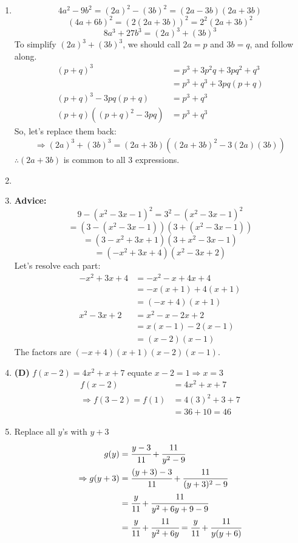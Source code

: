 \begin{multicols}{2}
\begin{enumerate}[label={\textbf{\arabic*.}}]
    \item 
    \[4a^2 - 9b^2 = (2a)^2 - (3b)^2 = (2a - 3b)(2a + 3b)\]
    \[(4a + 6b)^2 = \left(2(2a + 3b)\right)^2 = 2^2 (2a + 3b)^2\]
    \[ 8a^3 + 27b^3 = (2a)^3 + (3b)^3 \]
    To simplify \( (2a)^3 + (3b)^3 \), we should call \( 2a = p \) and \( 3b = q \), and follow along.
    \begin{align*}
        (p + q)^3 &= p^3 + 3p^2q + 3pq^2 + q^3 \\
        &= p^3 + q^3 + 3pq(p + q) \\
        (p + q)^3 - 3pq(p + q) &= p^3 + q^3 \\
        (p + q)((p + q)^2 - 3pq) &= p^3 + q^3
    \end{align*}
    So, let's replace them back:
    \[\Rightarrow (2a)^3 + (3b)^3 = (2a + 3b)\left((2a + 3b)^2 - 3(2a)(3b)\right)\]
    \(\therefore (2a + 3b)\) is common to all 3 expressions.

    \item
    \item \textbf{Advice:} 
    \[ 9 - (x^2 - 3x - 1)^2 = 3^2 - (x^2 - 3x - 1)^2\]  
    \[ = (3 - (x^2 - 3x - 1))(3 + (x^2 - 3x - 1))\]
    \[ = (3 - x^2 + 3x + 1)(3 + x^2 - 3x - 1) \]
    \[= (-x^2 + 3x + 4)(x^2 - 3x + 2)\]
    Let's resolve each part:
    \begin{align*}
    -x^2 + 3x + 4 &= -x^2 - x + 4x + 4 \\
    &= -x(x + 1) + 4(x + 1) \\
    &= (-x + 4)(x + 1)\\
    x^2 - 3x + 2 &= x^2 - x - 2x + 2 \\
    &= x(x - 1) - 2(x - 1) \\
    &= (x - 2)(x - 1)
    \end{align*}
    The factors are \((-x + 4)(x + 1)(x - 2)(x - 1)\).

    \item \textbf{(D)} $f(x - 2) = 4x^2 + x + 7 $ equate $x - 2 = 1 \Rightarrow x = 3$ 
    \begin{align*} 
        f(x - 2) &= 4x^2 + x + 7 \\
        \Rightarrow  f(3 - 2) = f(1) &= 4(3)^2 + 3 + 7 \\
        & = 36 + 10 = 46
    \end{align*}

    \item Replace all \(y\)'s with \(y + 3\)
    \begin{align*} 
        g(y) &= \cfrac{y - 3}{11} + \cfrac{11}{y^2 - 9} \\
       \Rightarrow  g(y + 3) &= \cfrac{(y + 3) - 3}{11} + \cfrac{11}{(y + 3)^2 - 9}  \\
        & = \cfrac{y}{11} + \cfrac{11}{y^2 + 6y + 9 -9} \\
        & = \cfrac{y}{11} + \cfrac{11}{y^2 + 6y} = \cfrac{y}{11} + \cfrac{11}{y(y + 6)}
    \end{align*}
    

\end{enumerate}
\end{multicols}
